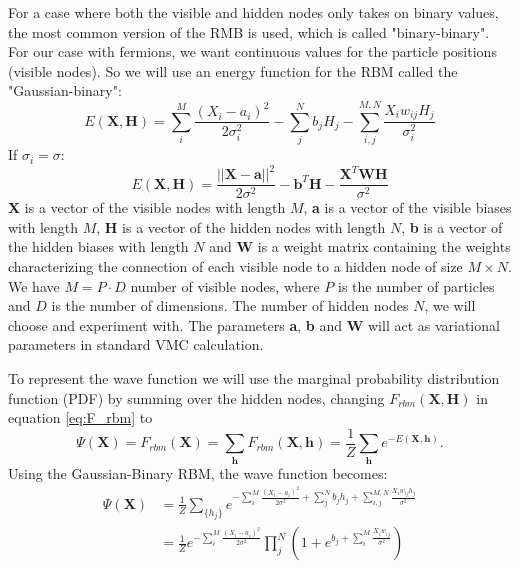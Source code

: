 \documentclass[12pt,a4paper,english]{article}
\begin{document}
For a case where both the visible and hidden nodes only takes on binary values, the most common version of the RMB is used, which is called "binary-binary". For our case with fermions, we want continuous values for the particle positions (visible nodes). So we will use an energy function for the RBM called the "Gaussian-binary":
\begin{equation}
\label{eq:Gaussian_binary}
E(\textbf{X},\textbf{H})=\sum_{i}^{M}\frac{(X_i-a_i)^2}{2\sigma_i^2} - \sum_{j}^{N}b_jH_j - \sum_{i,j}^{M,N}\frac{X_iw_{ij}H_j}{\sigma_i^2}
\end{equation}
If $\sigma_i=\sigma$:
\begin{equation}
\label{eq:Gaussian_binary2}
E(\textbf{X},\textbf{H})=\frac{||\textbf{X}-\textbf{a}||^2}{2\sigma^2} - \textbf{b}^T\textbf{H} - \frac{\textbf{X}^T\textbf{W}\textbf{H}}{\sigma^2}
\end{equation}
\textbf{X} is a vector of the visible nodes with length $M$, \textbf{a} is a vector of the visible biases with length $M$, \textbf{H} is a vector of the hidden nodes with length $N$, \textbf{b} is a vector of the hidden biases with length $N$ and \textbf{W} is a weight matrix containing the weights characterizing the connection of each visible node to a hidden node of size $M\times N$. We have $M=P\cdot D$ number of visible nodes, where $P$ is the number of particles and $D$ is the number of dimensions. The number of hidden nodes $N$, we will choose and experiment with. The parameters \textbf{a}, \textbf{b} and \textbf{W} will act as variational parameters in standard VMC calculation.

To represent the wave function we will use the marginal probability distribution function (PDF) by summing over the hidden nodes, changing $F_{rbm}(\textbf{X}, \textbf{H})$ in equation \ref{eq:F_rbm} to 
\begin{equation}
\label{eq:F_rbm_marginal}
\Psi(\textbf{X})=F_{rbm}(\textbf{X})=\sum_{\textbf{h}}F_{rbm}(\textbf{X}, \textbf{h})=\frac{1}{Z}\sum_{\textbf{h}}e^{-E(\textbf{X}, \textbf{h})}.
\end{equation}
Using the Gaussian-Binary RBM, the wave function becomes:
\begin{align}
\Psi(\textbf{X})&=\frac{1}{Z}\sum_{\{h_j\}}e^{-\sum_{i}^{M}\frac{(X_i-a_i)^2}{2\sigma^2} + \sum_{j}^{N}b_jh_j + \sum_{i,j}^{M,N}\frac{X_iw_{ij}h_j}{\sigma^2}}\nonumber\\
\label{eq:wave_func}
&=\frac{1}{Z}e^{-\sum_{i}^{M}\frac{(X_i-a_i)^2}{2\sigma^2}}\prod_{j}^{N}\left(1+e^{b_j + \sum_{i}^{M}\frac{X_iw_{ij}}{\sigma^2}}
\right)
\end{align}
\end{document}
